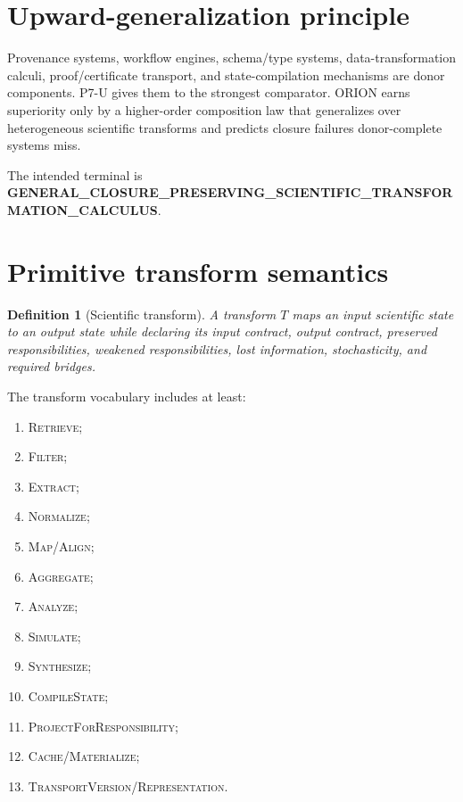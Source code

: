 \documentclass[11pt]{article}
\newtheorem{definition}{Definition}
\begin{document}
\section{Upward-generalization principle}
Provenance systems, workflow engines, schema/type systems, data-transformation calculi, proof/certificate transport, and state-compilation mechanisms are donor components. P7-U gives them to the strongest comparator. ORION earns superiority only by a higher-order composition law that generalizes over heterogeneous scientific transforms and predicts closure failures donor-complete systems miss.

The intended terminal is \textbf{GENERAL_CLOSURE_PRESERVING_SCIENTIFIC_TRANSFORMATION_CALCULUS}.

\section{Primitive transform semantics}
\begin{definition}[Scientific transform]
A transform $T$ maps an input scientific state to an output state while declaring its input contract, output contract, preserved responsibilities, weakened responsibilities, lost information, stochasticity, and required bridges.
\end{definition}

The transform vocabulary includes at least:
\begin{enumerate}
    \item \textsc{Retrieve};
    \item \textsc{Filter};
    \item \textsc{Extract};
    \item \textsc{Normalize};
    \item \textsc{Map/Align};
    \item \textsc{Aggregate};
    \item \textsc{Analyze};
    \item \textsc{Simulate};
    \item \textsc{Synthesize};
    \item \textsc{CompileState};
    \item \textsc{ProjectForResponsibility};
    \item \textsc{Cache/Materialize};
    \item \textsc{TransportVersion/Representation}.
\end{enumerate}
\end{document}
